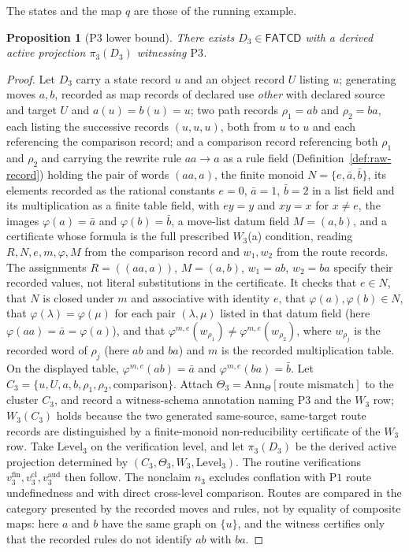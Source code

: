 \documentclass[11pt]{article}
\newtheorem{proposition}[theorem]{Proposition}
\theoremstyle{definition}
\newcommand{\FATCD}{\ensuremath{\mathsf{FATCD}}}
\newcommand{\Pone}{\ensuremath{\mathrm{P1}}}
\newcommand{\Pthree}{\ensuremath{\mathrm{P3}}}
\begin{document}
The states and the map \(q\) are those of the running example.

\begin{proposition}[\Pthree{} lower bound]\label{prop:p3-witness}
There exists \(D_3 \in \FATCD{}\) with a derived active projection
\(\pi_3(D_3)\) witnessing \Pthree{}.
\end{proposition}

\begin{proof}
Let \(D_3\) carry a state record \(u\) and an object record \(U\) listing \(u\);
generating moves \(a,b\), recorded as map records of declared use
\emph{other} with declared source and target \(U\) and \(a(u)=b(u)=u\);
two path records \(\rho_1=ab\) and \(\rho_2=ba\), each listing the successive
records \((u,u,u)\), both from \(u\) to \(u\) and each referencing the
comparison record; and a comparison record referencing both \(\rho_1\) and \(\rho_2\) and carrying the
rewrite rule \(aa\to a\) as a rule field (Definition~\ref{def:raw-record}) holding the pair of words \((aa,a)\), the finite monoid \(N=\{e,\bar a,\bar b\}\), its elements recorded as the rational constants \(e=0\), \(\bar a=1\), \(\bar b=2\) in a list field and its multiplication as a finite table field, with
\(ey=y\) and \(xy=x\) for \(x\neq e\), the images \(\varphi(a)=\bar a\) and
\(\varphi(b)=\bar b\), a move-list datum field \(M=(a,b)\), and a certificate whose
formula is the full prescribed \(W_3\)(a) condition, reading \(R,N,e,m,\varphi,M\)
from the comparison record and \(w_1,w_2\) from the route records. The
assignments \(R=((aa,a))\), \(M=(a,b)\), \(w_1=ab\), \(w_2=ba\) specify their
recorded values, not literal substitutions in the certificate. It checks that \(e\in N\), that \(N\) is closed under \(m\) and
associative with identity \(e\), that \(\varphi(a),\varphi(b)\in N\), that \(\varphi(\lambda)=\varphi(\mu)\) for each pair \((\lambda,\mu)\) listed in that datum field (here \(\varphi(aa)=\bar a=\varphi(a)\)), and that
\(\varphi^{m,e}(w_{\rho_1})\ne\varphi^{m,e}(w_{\rho_2})\), where \(w_{\rho_j}\) is the recorded word of \(\rho_j\) (here \(ab\) and \(ba\)) and \(m\) is
the recorded multiplication table. On the displayed table,
\(\varphi^{m,e}(ab)=\bar a\) and
\(\varphi^{m,e}(ba)=\bar b\). Let
\(C_3=\{u,U,a,b,\rho_1,\rho_2,\text{comparison}\}\).
Attach \(\Theta_3 = \mathrm{Ann}_\Theta[\text{route mismatch}]\) to the
cluster \(C_3\), and
record a witness-schema annotation naming \Pthree{} and the \(W_3\) row;
\(W_3(C_3)\) holds because the two generated same-source, same-target route
records are distinguished by a finite-monoid non-reducibility
certificate of the \(W_3\) row. Take \(\mathrm{Level}_3\) on the
verification level, and let \(\pi_3(D_3)\) be the derived active
projection determined by
\((C_3,\Theta_3,W_3,\mathrm{Level}_3)\). The routine verifications
\(v_3^{\mathrm{fin}}, v_3^{\mathrm{cl}}, v_3^{\mathrm{aud}}\) then
follow. The nonclaim \(n_3\) excludes conflation with
\Pone{} route undefinedness and with direct cross-level comparison.
Routes are compared in the category presented by the recorded moves and rules,
not by equality of composite maps: here \(a\) and \(b\) have the same graph on
\(\{u\}\), and the witness certifies only that the recorded rules do not
identify \(ab\) with \(ba\).
\end{proof}
\end{document}
